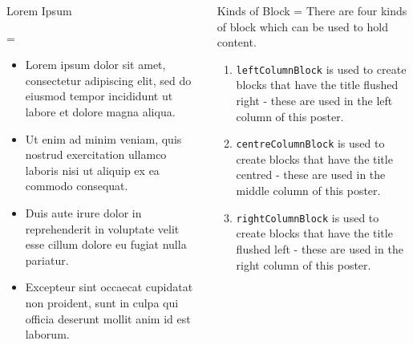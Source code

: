 \documentclass[final,hyperref={pdfpagelabels=false}]{beamer}
\newcommand{\correctitemizeindent}{\setlength{\leftmargini}{2.5em}}
\newlength{\columnheight}
\begin{document}
\begin{frame}
\begin{columns}[T]
\begin{column}{.32\textwidth}
\begin{minipage}[t]{.95\textwidth}
{		\begin{leftColumnBlock}{Lorem Ipsum}
		{
			\rightskip=\leftskip
			{\correctitemizeindent
			\begin{itemize}
				\item Lorem ipsum dolor sit amet, consectetur adipiscing elit, sed do eiusmod tempor incididunt ut labore et dolore magna aliqua.
				\item Ut enim ad minim veniam, quis nostrud exercitation ullamco laboris nisi ut aliquip ex ea commodo consequat.
				\item Duis aute irure dolor in reprehenderit in voluptate velit esse cillum dolore eu fugiat nulla pariatur.
				\item Excepteur sint occaecat cupidatat non proident, sunt in culpa qui officia deserunt mollit anim id est laborum.
			\end{itemize}
			}
		}	
		\end{leftColumnBlock}
			
		} %
		\end{minipage}
	\end{column}


		
	\begin{column}{.32\textwidth}
		\begin{minipage}[t]{.95\textwidth}
		\parbox[t][\columnheight]{\textwidth}{	  	
	  
		\begin{centreColumnBlock}{Kinds of Block}
			\rightskip=\leftskip
			There are four kinds of block which can be used to hold content.		
			\correctitemizeindent
			\begin{enumerate}
				\item \texttt{leftColumnBlock} is used to create blocks that have the title flushed right - these are used in the left column of this poster.
				\item \texttt{centreColumnBlock} is used to create blocks that have the title centred - these are used in the middle column of this poster.
				\item \texttt{rightColumnBlock} is used to create blocks that have the title flushed left - these are used in the right column of this poster.
			\end{enumerate}
			
		\end{centreColumnBlock}

		\vfill
		
}
\end{minipage}
\end{column}
\end{columns}
\end{frame}
\end{document}
